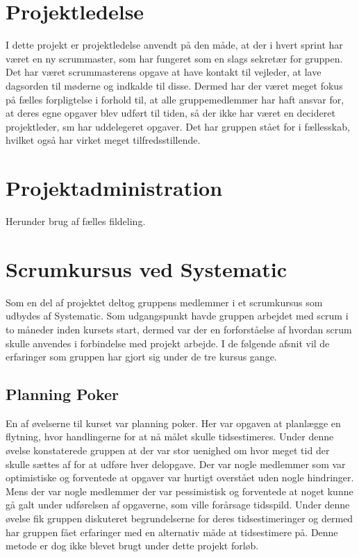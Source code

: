 \section{Projektledelse}
I dette projekt er projektledelse anvendt på den måde, at der i hvert sprint har været en ny scrummaster, som har fungeret som en slags sekretær for gruppen. Det har været scrummasterens opgave at have kontakt til vejleder, at lave dagsorden til møderne og indkalde til disse. Dermed har der været meget fokus på fælles forpligtelse i forhold til, at alle gruppemedlemmer har haft ansvar for, at deres egne opgaver blev udført til tiden, så der ikke har været en decideret projektleder, sm har uddelegeret opgaver. Det har gruppen stået for i fællesskab, hvilket også har virket meget tilfredsstillende. 

\section{Projektadministration}
Herunder brug af fælles fildeling.

\section{Scrumkursus ved Systematic}
Som en del af projektet deltog gruppens medlemmer i et scrumkursus som udbydes af Systematic. Som udgangspunkt havde gruppen arbejdet med scrum i to måneder inden kursets start, dermed var der en forforståelse af hvordan scrum skulle anvendes i forbindelse med projekt arbejde. I de følgende afsnit vil de erfaringer som gruppen har gjort sig under de tre kursus gange. 

\subsection{Planning Poker}
En af øvelserne til kurset var planning poker. Her var opgaven at planlægge en flytning, hvor handlingerne for at nå målet skulle tidsestimeres. Under denne øvelse konstaterede gruppen at der var stor uenighed om hvor meget tid der skulle sættes af for at udføre hver delopgave. Der var nogle medlemmer som var optimistiske og forventede at opgaver var hurtigt overstået uden nogle hindringer. Mens der var nogle medlemmer der var pessimistisk og forventede at noget kunne gå galt under udførelsen af opgaverne, som ville forårsage tidsspild. Under denne øvelse fik gruppen diskuteret begrundelserne for deres tidsestimeringer og dermed har gruppen fået erfaringer med en alternativ måde at tidsestimere på. Denne metode er dog ikke blevet brugt under dette projekt forløb.  

